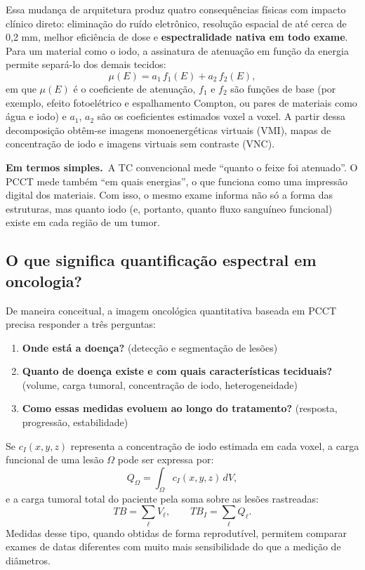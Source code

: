 \documentclass[11pt,a4paper]{article}
\newcommand{\simples}{\textcolor{titleblue}{\textbf{Em termos simples.}}\ }
\begin{document}
Essa mudança de arquitetura produz quatro consequências físicas com impacto clínico direto: eliminação do ruído eletrônico, resolução espacial de até cerca de 0,2 mm, melhor eficiência de dose e \textbf{espectralidade nativa em todo exame}. Para um material como o iodo, a assinatura de atenuação em função da energia permite separá-lo dos demais tecidos:
\begin{equation}
\mu(E) = a_{1}\, f_{1}(E) + a_{2}\, f_{2}(E),
\end{equation}
em que $\mu(E)$ é o coeficiente de atenuação, $f_{1}$ e $f_{2}$ são funções de base (por exemplo, efeito fotoelétrico e espalhamento Compton, ou pares de materiais como água e iodo) e $a_{1}$, $a_{2}$ são os coeficientes estimados voxel a voxel. A partir dessa decomposição obtêm-se imagens monoenergéticas virtuais (VMI), mapas de concentração de iodo e imagens virtuais sem contraste (VNC).

\begin{caixa}
\simples A TC convencional mede ``quanto o feixe foi atenuado''. O PCCT mede também ``em quais energias'', o que funciona como uma impressão digital dos materiais. Com isso, o mesmo exame informa não só a forma das estruturas, mas quanto iodo (e, portanto, quanto fluxo sanguíneo funcional) existe em cada região de um tumor.
\end{caixa}

\subsection{O que significa quantificação espectral em oncologia?}

De maneira conceitual, a imagem oncológica quantitativa baseada em PCCT precisa responder a três perguntas:

\begin{enumerate}
\item \textbf{Onde está a doença?} (detecção e segmentação de lesões)
\item \textbf{Quanto de doença existe e com quais características teciduais?} (volume, carga tumoral, concentração de iodo, heterogeneidade)
\item \textbf{Como essas medidas evoluem ao longo do tratamento?} (resposta, progressão, estabilidade)
\end{enumerate}

Se $c_{I}(x,y,z)$ representa a concentração de iodo estimada em cada voxel, a carga funcional de uma lesão $\Omega$ pode ser expressa por:
\begin{equation}
Q_{\Omega} = \int_{\Omega} c_{I}(x,y,z)\, dV,
\end{equation}
e a carga tumoral total do paciente pela soma sobre as lesões rastreadas:
\begin{equation}
TB = \sum_{\ell} V_{\ell}, \qquad TB_{I} = \sum_{\ell} Q_{\ell}.
\end{equation}
Medidas desse tipo, quando obtidas de forma reprodutível, permitem comparar exames de datas diferentes com muito mais sensibilidade do que a medição de diâmetros.
\end{document}
